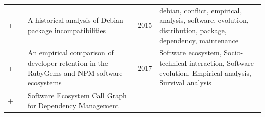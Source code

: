 \documentclass[]{book}
\begin{document}
\begin{longtable}[]{@{}lllll@{}}
\begin{minipage}[t]{0.01\columnwidth}\raggedright\strut
+\strut
\end{minipage} & \begin{minipage}[t]{0.09\columnwidth}\raggedright\strut
\citet{Claes2015}\strut
\end{minipage} & \begin{minipage}[t]{0.34\columnwidth}\raggedright\strut
A historical analysis of Debian package incompatibilities\strut
\end{minipage} & \begin{minipage}[t]{0.02\columnwidth}\raggedright\strut
2015\strut
\end{minipage} & \begin{minipage}[t]{0.39\columnwidth}\raggedright\strut
debian, conflict, empirical, analysis, software, evolution,
distribution, package, dependency, maintenance\strut
\end{minipage}\tabularnewline
\begin{minipage}[t]{0.01\columnwidth}\raggedright\strut
+\strut
\end{minipage} & \begin{minipage}[t]{0.09\columnwidth}\raggedright\strut
\citet{Constantinou2017}\strut
\end{minipage} & \begin{minipage}[t]{0.34\columnwidth}\raggedright\strut
An empirical comparison of developer retention in the RubyGems and NPM
software ecosystems\strut
\end{minipage} & \begin{minipage}[t]{0.02\columnwidth}\raggedright\strut
2017\strut
\end{minipage} & \begin{minipage}[t]{0.39\columnwidth}\raggedright\strut
Software ecosystem, Socio-technical interaction, Software evolution,
Empirical analysis, Survival analysis\strut
\end{minipage}\tabularnewline
\begin{minipage}[t]{0.01\columnwidth}\raggedright\strut
+\strut
\end{minipage} & \begin{minipage}[t]{0.09\columnwidth}\raggedright\strut
\citet{Hejderup2018}\strut
\end{minipage} & \begin{minipage}[t]{0.34\columnwidth}\raggedright\strut
Software Ecosystem Call Graph for Dependency Management\strut
\end{minipage} & \begin{minipage}[t]{0.02\columnwidth}\raggedright\strut

\end{minipage}
\end{longtable}
\end{document}
